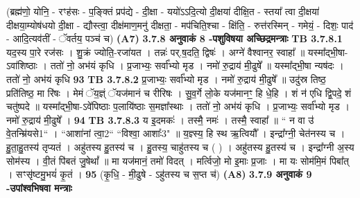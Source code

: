 \documentclass[17pt]{extarticle}
\begin{document}
{{{{{{{{{{{{{{{{{{{                  \newline
                                    (ब्रह्म॑णो॒ योनि॒ - रꣳह॑सः - प॒ङ्क्तिं प्रप॑द्ये - दी॒क्षा - ययो॑ऽऽदि॒त्यो दी॒क्षया॑ दीक्षि॒त - स्तया᳚ त्वा दी॒क्षया॑ दीक्षया॒म्योष॑धयो दी॒क्षा - द्यौस्त्वा॒ दीक्ष॑माण॒मनु॑ दीक्षता॒ - मप॑चिति॒श्चा - क्षि॑ति॒ - रुत्त॑रस्मिन् - गमेयं॒ - दिशः॒ पाद॑ - आदि॒त्यव॑तीं - ॅवर्तय॒ पञ्च॑ च) \textbf{(A7)} \newline \newline
                \textbf{ 3.7.8     अनुवाकं   8 -पशुविषया अच्छिद्रमन्त्राः} \newline
                                \textbf{ TB 3.7.8.1} \newline
                  यद॒स्य पा॒रे रज॑सः । शु॒क्रं ज्योति॒-रजा॑यत । तन्नः॑ पर्.ष॒दति॒ द्विषः॑ । अग्ने॑ वैश्वानर॒ स्वाहा᳚ ॥ यस्मा᳚द्भी॒षा-ऽवा॑शिष्ठाः । ततो॑ नो॒ अभ॑यं कृधि । प्र॒जाभ्यः॒ सर्वा᳚भ्यो मृड । नमो॑ रु॒द्राय॑ मी॒ढुषे᳚ ॥ यस्मा᳚द्भी॒षा न्यष॑दः । ततो॑ नो॒ अभ॑यं कृधि \textbf{ 93} \newline
                  \newline
                                \textbf{ TB 3.7.8.2} \newline
                  प्र॒जाभ्यः॒ सर्वा᳚भ्यो मृड । नमो॑ रु॒द्राय॑ मी॒ढुषे᳚ ॥ उदु॑स्र तिष्ठ॒ प्रति॑तिष्ठ॒ मा रि॑षः । मेमं ॅय॒ज्ञ्ं ॅयज॑मानं च रीरिषः । सु॒व॒र्गे लो॒के यज॑मानꣳ॒॒ हि धे॒हि । शं न॑ एधि द्वि॒पदे॒ शं चतु॑ष्पदे ॥ यस्मा᳚द्भी॒षा-ऽवे॑पिष्ठाः प॒लायि॑ष्ठाः स॒मज्ञा᳚स्थाः । ततो॑ नो॒ अभ॑यं कृधि । प्र॒जाभ्यः॒ सर्वा᳚भ्यो मृड । नमो॑ रु॒द्राय॑ मी॒ढुषे᳚ । \textbf{ 94} \newline
                  \newline
                                \textbf{ TB 3.7.8.3} \newline
                  य इ॒दमकः॑ । तस्मै॒ नमः॑ । तस्मै॒ स्वाहा᳚ ॥ “ न वा उ॑ वे॒तन्म्रि॑यसे{1}“ । “आशा॑नां त्वा॒{2}“ “विश्वा॒ आशाः᳚{3}" ॥ य॒ज्ञ्स्य॒ हि स्थ ऋ॒त्वियौ᳚ । इन्द्रा᳚ग्नी॒ चेत॑नस्य च । हु॒ता॒हु॒तस्य॑ तृप्यतं । अहु॑तस्य हु॒तस्य॑ च । हु॒तस्य॒ चाहु॑तस्य च ( ) । अहु॑तस्य हु॒तस्य॑ च । इन्द्रा᳚ग्नी अ॒स्य सोम॑स्य । वी॒तं पि॑बतं जु॒षेथां᳚ ॥ मा यज॑मानं॒ तमो॑ विदत् । मर्त्विजो॒ मो इ॒माः प्र॒जाः । मा यः सोम॑मि॒मं पिबा᳚त् । सꣳसृ॑ष्टमु॒भयं॑ कृ॒तं । \textbf{ 95} \newline
                  \newline
                                    (कृ॒धि॒ - मी॒ढुषे - ऽहु॑तस्य च स॒प्त च॑) \textbf{(A8)} \newline \newline
                \textbf{ 3.7.9     अनुवाकं   9 -उपांश्वभिषवा मन्त्राः} \newline
}}}}}}}}}}}}}}}}}}}
\end{document}
